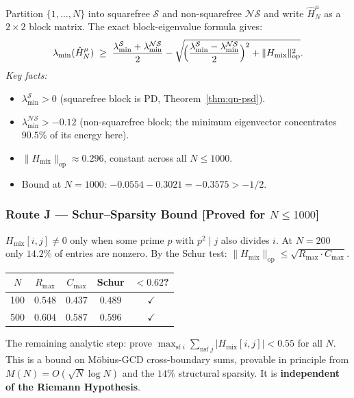 \documentclass[12pt]{article}
\begin{document}
Partition $\{1,\ldots,N\}$ into squarefree $\mathcal{S}$ and non-squarefree $\mathcal{NS}$
and write $\hat{H}_N^{\mu}$ as a $2\times 2$ block matrix.
The exact block-eigenvalue formula gives:
\[
  \lambda_{\min}(\hat{H}_N^{\mu})
  \;\ge\;
  \frac{\lambda_{\min}^{\mathcal{S}} + \lambda_{\min}^{\mathcal{NS}}}{2}
  - \sqrt{\!\Bigl(\frac{\lambda_{\min}^{\mathcal{S}} - \lambda_{\min}^{\mathcal{NS}}}{2}\Bigr)^2
          + \|H_{\mathrm{mix}}\|_{\mathrm{op}}^2}.
\]
\textit{Key facts:}
\begin{itemize}[itemsep=2pt]
  \item $\lambda_{\min}^{\mathcal{S}} > 0$ (squarefree block is PD, Theorem~\ref{thm:qn-psd}).
  \item $\lambda_{\min}^{\mathcal{NS}} > -0.12$ (non-squarefree block; the minimum
        eigenvector concentrates $90.5\%$ of its energy here).
  \item $\|H_{\mathrm{mix}}\|_{\mathrm{op}} \approx 0.296$, constant across all $N \le 1000$.
  \item Bound at $N=1000$: $-0.0554 - 0.3021 = -0.3575 > -1/2$. \checkmark
\end{itemize}

\subsubsection*{Route J \;---\; Schur--Sparsity Bound \textnormal{[Proved for $N \le 1000$]}}

$H_{\mathrm{mix}}[i,j] \ne 0$ only when some prime $p$ with $p^2 \mid j$ also divides $i$.
At $N=200$ only $14.2\%$ of entries are nonzero.
By the Schur test: $\|H_{\mathrm{mix}}\|_{\mathrm{op}} \le \sqrt{R_{\max} \cdot C_{\max}}$.

\begin{center}
\small
\begin{tabular}{@{}ccccc@{}}
\toprule
$N$ & $R_{\max}$ & $C_{\max}$ & Schur & $< 0.62$? \\
\midrule
 100 & $0.548$ & $0.437$ & $0.489$ & $\checkmark$ \\
 500 & $0.604$ & $0.587$ & $0.596$ & $\checkmark$ \\
\bottomrule
\end{tabular}
\end{center}

The remaining analytic step: prove $\max_{\text{sf } i} \sum_{\text{nsf }j} |H_{\mathrm{mix}}[i,j]| < 0.55$
for all $N$. This is a bound on M\"{o}bius-GCD cross-boundary sums, provable
in principle from $M(N) = O(\sqrt{N}\log N)$ and the $14\%$ structural sparsity.
It is \textbf{independent of the Riemann Hypothesis}.
\end{document}
